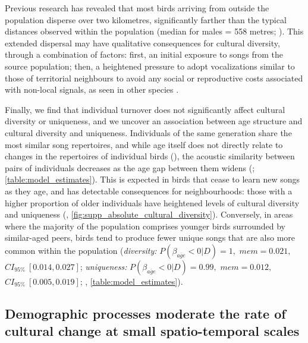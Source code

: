 Previous research \autocite{verhulst1997}  has revealed that most birds arriving from outside the population disperse over two kilometres, significantly farther than the typical distances observed within the population (median for males = 558 metres; \cite{greenwood1979}). This extended dispersal may have qualitative consequences for cultural diversity, through a combination of factors: first, an initial exposure to songs from the source population; then, a heightened pressure to adopt vocalizations similar to those of territorial neighbours to avoid any social or reproductive costs associated with non-local signals, as seen in other species \autocite{payne1983, baker1981, mortega2014, lachlan2014, beecher2008}.

Finally, we find that individual turnover does not significantly affect cultural diversity or uniqueness, and we uncover an association between age structure and cultural diversity and uniqueness. Individuals of the same generation share the most similar song repertoires, and while age itself does not directly relate to changes in the repertoires of individual birds (), the acoustic similarity between pairs of individuals decreases as the age gap between them widens (; \autoref{table:model_estimates}). This is expected in birds that cease to learn new songs as they age, and has detectable consequences for neighbourhoods: those with a higher proportion of older individuals have heightened levels of cultural diversity and uniqueness (, \autoref{fig:supp_absolute_cultural_diversity}). Conversely, in areas where the majority of the population comprises younger birds surrounded by similar-aged peers, birds tend to produce fewer unique songs that are also more common within the population (\textit{diversity:} $P(\beta_{\overline{age}} < 0 | D) = 1,$ $mem=0.021,$ $CI_{95\%}~[0.014, 0.027]$; \textit{uniqueness:} $P(\beta_{\overline{age}} < 0 | D) = 0.99,$ $mem=0.012,$ $CI_{95\%}~[0.005, 0.019]$; , \autoref{table:model_estimates}).

\subsection{Demographic processes moderate the rate of cultural change at small spatio-temporal scales}

